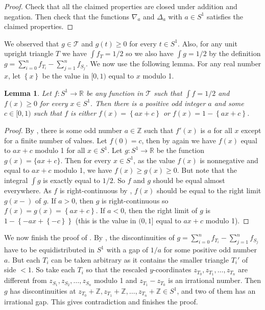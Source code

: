 \documentclass[a4paper]{amsart}
\theoremstyle{plain}
\newtheorem{lemma}{Lemma}
\theoremstyle{definition}
\begin{document}
\begin{proof}
Check that all the claimed properties are closed under addition and negation. Then check that the functions \(\nabla_a\) and \(\Delta_a\) with \(a \in S^1\) satisfies the claimed properties.
\end{proof}

We observed that \(g \in \mathcal{T}\) and \(g(t) \geq 0\) for every \(t \in S^1\). Also, for any unit upright triangle \(T\) we have \(\int f_T = 1/2\) so we also have \(\int g = 1/2\) by the definition \(g = \sum_{i=0}^n f_{T_i} - \sum_{j=1}^n f_{S_j}\). 
We now use the following lemma.
For any real number \(x\), let \(\left\{ x \right\}\) be the value in \([0, 1)\) equal to \(x\) modulo 1.

\begin{lemma}

Let \(f : S^1 \to \mathbb{R}\) be any function in \(\mathcal{T}\) such that \(\int f = 1/2\) and \(f(x) \geq 0\) for every \(x \in S^1\). Then there is a positive odd integer \(a\) and some \(c \in [0, 1)\) such that \(f\) is either \(f(x) = \left\{ ax + c \right\}\) or \(f(x) = 1 - \left\{ ax + c \right\}\).

\label{lem:triangle-unit-area}
\end{lemma}

\begin{proof}
By , there is some odd number \(a \in \mathbb{Z}\) such that \(f'(x)\) is \(a\) for all \(x\) except for a finite number of values. Let \(f(0) = c\), then by  again we have \(f(x)\) equal to \(ax + c\) modulo 1 for all \(x \in S^1\). Let \(g : S^1 \to \mathbb{R}\) be the function \(g(x) = \{ax + c\}\). Then for every \(x \in S^1\), as the value \(f(x)\) is nonnegative and equal to \(ax + c\) modulo 1, we have \(f(x) \geq g(x) \geq 0\). But note that the integral \(\int g\) is exactly equal to \(1/2\). So \(f\) and \(g\) should be equal almost everywhere. As \(f\) is right-continuous by , \(f(x)\) should be equal to the right limit \(g(x -)\) of \(g\).
If \(a > 0\), then \(g\) is right-continuous so \(f(x) = g(x) = \left\{ ax + c \right\}\). If \(a < 0\), then the right limit of \(g\) is \(1 - \left\{ -ax + \left\{ - c \right\} \right\}\) (this is the value in \((0, 1]\) equal to \(ax + c\) modulo 1).
\end{proof}

We now finish the proof of . By , the discontinuities of \(g = \sum_{i=0}^n f_{T_i} - \sum_{j=1}^n f_{S_j}\) have to be equidistributed in \(S^1\) with a gap of \(1/a\) for some positive odd number \(a\).
But each \(T_i\) can be taken arbitrary as it contains the smaller triangle \(T_i'\) of side \(< 1\). So take each \(T_i\) so that the rescaled \(y\)-coordinates \(z_{T_0}, z_{T_1}, \dots, z_{T_n}\) are different from \(z_{S_1}, z_{S_2}, \dots, z_{S_n}\) modulo 1 and \(z_{T_1} - z_{T_0}\) is an irrational number.
Then \(g\) has discontinuities at \(z_{T_0} + \mathbb{Z}, z_{T_1} + \mathbb{Z}, \dots, z_{T_n} + \mathbb{Z} \in S^1\), and two of them has an irrational gap. This gives contradiction and finishes the proof.



\end{document}
